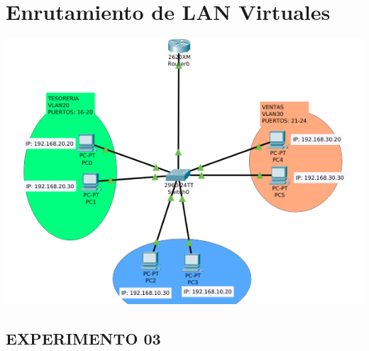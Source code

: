 \section{Enrutamiento de LAN Virtuales}
\includegraphics[scale=0.5]{img/enrutam.png} 
\subsection{EXPERIMENTO 03}

